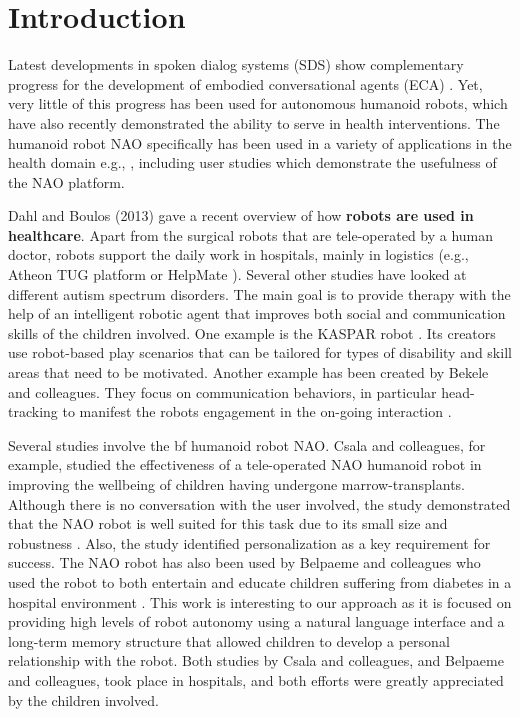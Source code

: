\documentclass[letterpaper]{article}
\begin{document}
\section{Introduction} \label{intro}

Latest developments in spoken dialog systems (SDS) show complementary progress for the development of  embodied conversational agents (ECA) \cite{YASCLL14}. Yet, very little of
this progress has been used for autonomous humanoid robots, which have also recently demonstrated the ability
to serve in health interventions. The
humanoid robot NAO specifically has been used in a variety of applications in the health domain e.g.,
\cite{MAJA13}, including user studies which demonstrate the usefulness of the NAO platform.

Dahl and Boulos (2013) \nocite{robotics3010001} gave a recent overview of how {\bf robots are used in
healthcare}. Apart from the  surgical robots that are tele-operated by a human doctor, robots support
the daily work in hospitals, mainly in logistics (e.g., Atheon TUG platform \cite{bloss2011mobile}
or HelpMate \cite{evans1998helpmate}). Several other studies have looked at different autism
spectrum disorders. The main goal is to provide therapy with the help of an intelligent robotic
agent that improves both social and communication skills of the children involved. One example is
the KASPAR robot \cite{robins2012scenarios}. Its creators use robot-based play scenarios that can
be tailored for types of disability and skill areas that need to be motivated. Another example has
been created by Bekele and colleagues. They focus on communication behaviors, in particular
head-tracking to manifest the robots engagement in the on-going interaction \cite{bekele2013step}.  

Several studies involve the {bf humanoid robot NAO}. Csala and colleagues, for example,
studied the effectiveness of a tele-operated NAO humanoid robot in improving the wellbeing of
children having undergone marrow-transplants. Although there is no conversation with the user
involved, the study demonstrated that the NAO robot is well suited for this task due to its small
size and robustness \cite{Csala2012}. Also, the study identified personalization as a key
requirement for success. The NAO robot has also been used by Belpaeme and colleagues who used the
robot to both entertain and educate children suffering from diabetes in a hospital environment
\cite{belpaeme2012multimodal}. This work is interesting to our approach as it is focused on
providing high levels of robot autonomy using a natural language interface and a long-term memory
structure that allowed children to develop a personal relationship with the robot. Both studies by
Csala and colleagues, and Belpaeme and colleagues, took place in hospitals, and both efforts were
greatly appreciated by the children involved.
\end{document}
